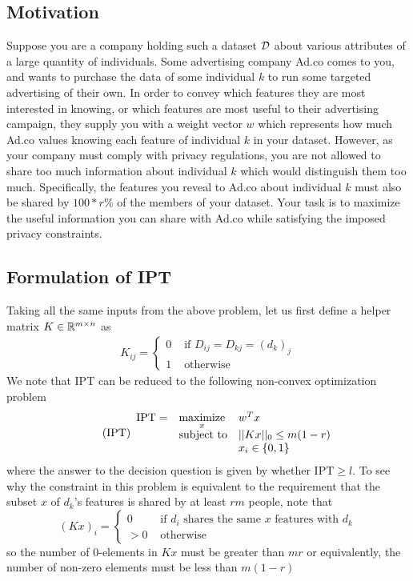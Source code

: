 \documentclass[12pt]{article}
\newcommand{\priv}{\text{IPT}}
\begin{document}
\subsection{Motivation}
Suppose you are a company holding such a dataset $\mathcal{D}$ about various attributes of a large quantity of individuals. Some advertising company Ad.co comes to you, and wants to purchase the data of some individual $k$ to run some targeted advertising of their own. In order to convey which features they are most interested in knowing, or which features are most useful to their advertising campaign, they supply you with a weight vector $w$ which represents how much Ad.co values knowing each feature of individual $k$ in your dataset. However, as your company must comply with privacy regulations, you are not allowed to share too much information about individual $k$ which would distinguish them too much. Specifically, the features you reveal to Ad.co about individual $k$ must also be shared by $100 * r\%$ of the members of your dataset. Your task is to maximize the useful information you can share with Ad.co while satisfying the imposed privacy constraints.


\subsection{Formulation of \gls{IPT}}
Taking all the same inputs from the above problem, let us first define a helper matrix $K \in \mathbb{R}^{m\times n}$ as
\begin{align*}
    K_{ij} = \begin{cases}
        0 & \text{ if } D_{ij} = D_{kj} = (d_k)_j\\
        1 & \text{ otherwise}
    \end{cases}
\end{align*} 
We note that \gls{IPT} can be reduced to the following non-convex optimization problem
\begin{equation}
	\label{eq:priv} 
    \tag{$\priv$} 
	\begin{array}{lll}
		\priv = & \underset{x}{\text{maximize}} & w^T x \\
		& \mbox{subject to} & ||K x||_{0}  \leq m(1-r) \\
        && x_i \in \{0,1\}
		\end{array}
\end{equation}
where the answer to the decision question is given by whether $\priv \geq l$. To see why the constraint in this problem is equivalent to the requirement that the subset $x$ of $d_k$'s features is shared by at least $rm$ people, note that  \[(Kx)_i = \begin{cases}
    0 & \text{ if } d_i \text{ shares the same } x \text{ features with } d_k \\
    > 0 & \text{ otherwise}
\end{cases}
\]
so the number of 0-elements in $Kx$ must be greater than $mr$ or equivalently, the number of non-zero elements must be less than $m(1-r)$ 
\end{document}
